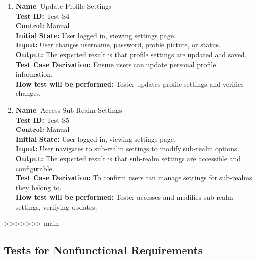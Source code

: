 \documentclass[12pt, titlepage]{article}
\begin{document}
\begin{enumerate}
    \item \textbf{Name:} {Update Profile Settings} \label{itm:Test-S4}\\
    \textbf{Test ID:} Test-S4\\
    \textbf{Control:} Manual \\
    \textbf{Initial State:} User logged in, viewing settings page. \\
    \textbf{Input:} User changes username, password, profile picture, or status. \\
    \textbf{Output:} The expected result is that profile settings are updated and saved. \\
    \textbf{Test Case Derivation:} Ensure users can update personal profile information. \\
    \textbf{How test will be performed:} Tester updates profile settings and verifies changes.

    \item \textbf{Name:} {Access Sub-Realm Settings} \label{itm:Test-S5}\\
    \textbf{Test ID:} Test-S5\\
    \textbf{Control:} Manual \\
    \textbf{Initial State:} User logged in, viewing settings page. \\
    \textbf{Input:} User navigates to sub-realm settings to modify sub-realm options. \\
    \textbf{Output:} The expected result is that sub-realm settings are accessible and configurable. \\
    \textbf{Test Case Derivation:} To confirm users can manage settings for sub-realms they belong to. \\
    \textbf{How test will be performed:} Tester accesses and modifies sub-realm settings, verifying updates.

\end{enumerate}
>>>>>>> main

\subsection{Tests for Nonfunctional Requirements}

\end{document}
